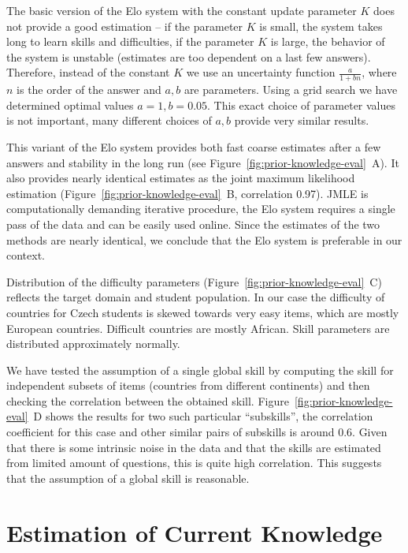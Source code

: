 \documentclass{edm_template}
\begin{document}
The basic version of the Elo system with the constant update parameter $K$ does
not provide a good estimation -- if the parameter $K$ is small, the system takes
long to learn skills and difficulties, if the parameter $K$ is large, the
behavior of the system is unstable (estimates are too dependent on a last few
answers). Therefore, instead of the constant $K$ we use an uncertainty function
$\frac{a}{1+bn}$, where $n$ is the order of the answer and $a,b$ are
parameters. Using a grid search we have determined optimal values $a=1,
b=0.05$. This exact choice of parameter values is not important, many different
choices of $a,b$ provide very similar results.

This variant of the Elo system provides both fast coarse estimates after a few
answers and stability in the long run (see
Figure~\ref{fig:prior-knowledge-eval}~A). It also provides nearly identical
estimates as the joint maximum likelihood estimation
(Figure~\ref{fig:prior-knowledge-eval}~B, correlation 0.97). JMLE is
computationally demanding iterative procedure, the Elo system requires a single
pass of the data and can be easily used online. Since the estimates of the two
methods are nearly identical, we conclude that the Elo system is preferable in
our context.

Distribution of the difficulty parameters
(Figure~\ref{fig:prior-knowledge-eval}~C) reflects the target domain and
student population. In our case the difficulty of countries for Czech students
is skewed towards very easy items, which are mostly European countries.
Difficult countries are mostly African. Skill parameters are distributed
approximately normally.

We have tested the assumption of a single global skill by computing the skill for
independent subsets of items (countries from different continents) and then
checking the correlation between the obtained skill.
Figure~\ref{fig:prior-knowledge-eval}~D shows the results for two such
particular ``subskills'', the correlation coefficient for this case and other
similar pairs of subskills is around 0.6. Given that there is some intrinsic
noise in the data and that the skills are estimated from limited amount of
questions, this is quite high correlation. This suggests that the assumption of
a global skill is reasonable.




\section{Estimation of Current Knowledge}
\end{document}
